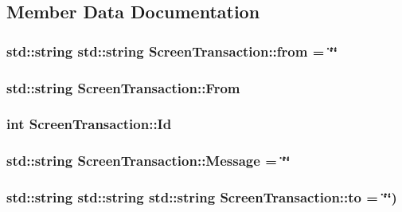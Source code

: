 \subsection{Member Data Documentation}
\hypertarget{class_screen_transaction_a1bf44d50b78f0e50807314e9e7246332}{
\subsubsection[{from}]{\setlength{\rightskip}{0pt plus 5cm}std\-::string std\-::string Screen\-Transaction\-::from = \char`\"{}\char`\"{}}}\label{class_screen_transaction_a1bf44d50b78f0e50807314e9e7246332}
\hypertarget{class_screen_transaction_a6beff6473b1f9537a68feede691526e2}{
\subsubsection[{From}]{\setlength{\rightskip}{0pt plus 5cm}std\-::string Screen\-Transaction\-::\-From\hspace{0.3cm}{\ttfamily [protected]}}}\label{class_screen_transaction_a6beff6473b1f9537a68feede691526e2}
\hypertarget{class_screen_transaction_acc2108d68c434499915514c1046d9806}{
\subsubsection[{Id}]{\setlength{\rightskip}{0pt plus 5cm}int Screen\-Transaction\-::\-Id\hspace{0.3cm}{\ttfamily [protected]}}}\label{class_screen_transaction_acc2108d68c434499915514c1046d9806}
\hypertarget{class_screen_transaction_a212573d9bccda5210fb4bf82211fce07}{
\subsubsection[{Message}]{\setlength{\rightskip}{0pt plus 5cm}std\-::string Screen\-Transaction\-::\-Message = \char`\"{}\char`\"{}}}\label{class_screen_transaction_a212573d9bccda5210fb4bf82211fce07}
\hypertarget{class_screen_transaction_a00495b6a53c3cfc8bfe861138841a5c5}{
\subsubsection[{to}]{\setlength{\rightskip}{0pt plus 5cm}std\-::string std\-::string std\-::string Screen\-Transaction\-::to = \char`\"{}\char`\"{})}}\label{class_screen_transaction_a00495b6a53c3cfc8bfe861138841a5c5}
